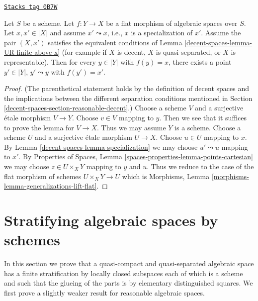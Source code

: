 \begin{lemma}
\label{decent-spaces-lemma-generalizations-lift-flat}
\href{https://stacks.math.columbia.edu/tag/0B7W}{\texttt{Stacks tag 0B7W}}

Let $S$ be a scheme. Let $f : Y \to X$ be a  flat morphism of algebraic spaces
over $S$. Let $x, x' \in |X|$ and assume $x' \leadsto x$, i.e., $x$ is a
specialization of $x'$. Assume the pair $(X, x')$ satisfies the equivalent
conditions of Lemma \ref{decent-spaces-lemma-UR-finite-above-x} (for example if
$X$ is decent, $X$ is quasi-separated, or $X$ is representable).
Then for every $y \in |Y|$ with $f(y) = x$, there exists a point $y' \in |Y|$,
$y' \leadsto y$ with $f(y') = x'$.
\end{lemma}

\begin{proof}
(The parenthetical statement holds by the definition of decent spaces
and the implications between the different separation conditions
mentioned in Section \ref{decent-spaces-section-reasonable-decent}.)
Choose a scheme $V$ and a surjective \'etale morphism $V \to Y$.
Choose $v \in V$ mapping to $y$. Then we see that it suffices to
prove the lemma for $V \to X$. Thus we may assume $Y$ is a scheme.
Choose a scheme $U$ and a surjective \'etale morphism $U \to X$.
Choose $u \in U$ mapping to $x$. By Lemma \ref{decent-spaces-lemma-specialization}
we may choose $u' \leadsto u$ mapping to $x'$. By
Properties of Spaces, Lemma \ref{spaces-properties-lemma-points-cartesian}
we may choose $z \in U \times_X Y$ mapping to $y$ and $u$.
Thus we reduce to the case of the flat morphism of
schemes $U \times_X Y \to U$ which is
Morphisms, Lemma \ref{morphisms-lemma-generalizations-lift-flat}.
\end{proof}

\section{Stratifying algebraic spaces by schemes}
\label{decent-spaces-section-stratifications}
In this section we prove that a quasi-compact and quasi-separated
algebraic space has a finite stratification by locally closed subspaces
each of which is a scheme and such that the glueing of the parts is by
elementary distinguished squares. We first prove a slightly weaker
result for reasonable algebraic spaces.

